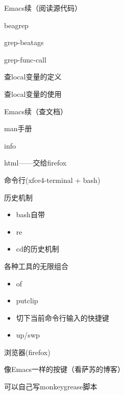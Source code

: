 \documentclass[presentation,dvipdfmx,CJKbookmarks]{beamer}
\begin{document}
\begin{CJK*}{UTF8}{simsun}
\begin{frame}[label={sec:org3bd59af}]{Emacs续（阅读源代码）}
\begin{block}{beagrep}
\end{block}
\begin{block}{grep-beatags}
\end{block}
\begin{block}{grep-func-call}
\end{block}
\begin{block}{查local变量的定义}
\end{block}
\begin{block}{查local变量的使用}
\end{block}
\end{frame}
\begin{frame}[label={sec:orgd9ae5c1}]{Emacs续（查文档）}
\begin{block}{man手册}
\end{block}
\begin{block}{info}
\end{block}
\begin{block}{html——交给firefox}
\end{block}
\end{frame}
\begin{frame}[label={sec:orgce9438c}]{命令行(xfce4-terminal + bash)}
\begin{block}{历史机制}
\begin{itemize}
\item bash自带
\item re
\item cd的历史机制
\end{itemize}
\end{block}
\begin{block}{各种工具的无限组合}
\begin{itemize}
\item of
\item putclip
\item 切下当前命令行输入的快捷键
\item up/swp
\end{itemize}
\end{block}
\end{frame}
\begin{frame}[label={sec:orgaebad94}]{浏览器(firefox)}
\begin{block}{像Emacs一样的按键（看萨苏的博客）}
\end{block}
\begin{block}{可以自己写monkeygrease脚本}
\end{block}

\end{frame}
\end{CJK*}
\end{document}

